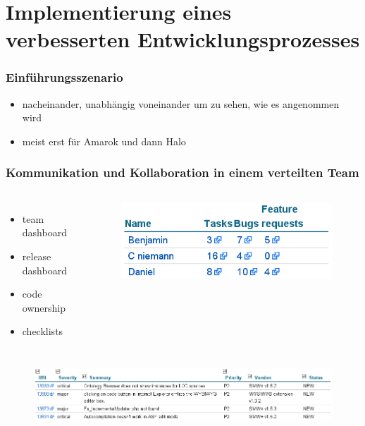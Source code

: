 \documentclass{beamer}
\begin{document}
\section{Implementierung eines verbesserten Entwicklungsprozesses}

\begin{frame}
\frametitle{Einf\"uhrungsszenario}
\begin{itemize}
 \item nacheinander, unabh\"angig voneinander um zu sehen, wie es angenommen wird
 \item meist erst f\"ur Amarok und dann Halo
\end{itemize}
\end{frame}

\begin{frame}
\frametitle{Kommunikation und Kollaboration in einem verteilten Team}
\begin{columns}
   \begin{itemize}
     \item team dashboard
     \item release dashboard
     \item code ownership
     \item checklists
   \end{itemize}
   \begin{figure}
     \includegraphics[scale=0.4,keepaspectratio=true]{./TeamDashboardTable.png}
   \end{figure}
\end{columns}
   \begin{figure}
     \includegraphics[scale=0.45,keepaspectratio=true]{./bugListHalo.png}
   \end{figure}
\end{frame}
\end{document}

